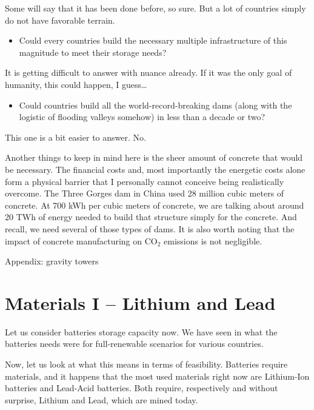 Some will say that it has been done before, so sure. But a lot of countries simply do not have favorable terrain.


\begin{itemize}
\item Could every countries build the necessary multiple infrastructure of this magnitude to meet their storage needs?
\end{itemize}

It is getting difficult to answer with nuance already. If it was the only goal of humanity, this could happen, I guess\ldots


\begin{itemize}
\item Could countries build all the world-record-breaking dams (along with the logistic of flooding valleys somehow) in less than a decade or two?
\end{itemize}

This one is a bit easier to answer. No.


Another things to keep in mind here is the sheer amount of concrete that would be necessary. The financial costs and, most importantly the energetic costs alone form a physical barrier that I personally cannot conceive being realistically overcome. The Three Gorges dam in China used 28 million cubic meters of concrete. At 700 kWh per cubic meters of concrete, we are talking about around 20 TWh of energy needed to build that structure simply for the concrete. And recall, we need several of those types of dams. It is also worth noting that the impact of concrete manufacturing on $\mathrm{CO_2}$ emissions is not negligible.


Appendix: gravity towers



\section{Materials I -- Lithium and Lead}

Let us consider batteries storage capacity now. We have seen in  what the batteries needs were for full-renewable scenarios for various countries.

Now, let us look at what this means in terms of feasibility. Batteries require materials, and it happens that the most used materials right now are Lithium-Ion batteries and Lead-Acid batteries. Both require, respectively and without surprise, Lithium and Lead, which are mined today. 

